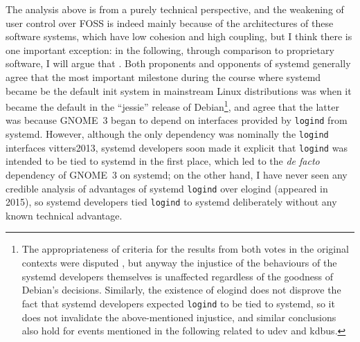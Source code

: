 The analysis above is from a purely technical perspective, and the weakening
of user control over FOSS is indeed mainly because of the architectures of these
software systems, which have low cohesion and high coupling, but I think there
is one important exception: in the following, through comparison to proprietary
software, I will argue that .  Both proponents and
opponents of systemd generally agree that the most important milestone during
the course where systemd became be the default init system in mainstream
Linux distributions was when it became the default in the ``jessie'' release
of Debian\footnote{The appropriateness of
criteria for the results from both votes in the original contexts were disputed%
, but anyway the injustice of the behaviours
of the systemd developers themselves is unaffected regardless of the goodness
of Debian's decisions.  Similarly, the existence of elogind does not disprove
the fact that systemd developers expected \texttt{logind} to be tied to systemd,
so it does not invalidate the above-mentioned injustice, and similar conclusions
also hold for events mentioned in the following related to udev and kdbus.},
and agree that the latter was because GNOME~3 began to depend on interfaces
provided by \verb|logind| from systemd.  However, although
the only dependency was nominally the \verb|logind| interfaces\cupercite%
{vitters2013}, systemd developers soon made it explicit that \verb|logind| was
intended to be tied to systemd in the first place,
which led to the \emph{de facto} dependency of GNOME~3 on systemd; on the
other hand, I have never seen any credible analysis of advantages of systemd
\verb|logind| over elogind (appeared in 2015), so systemd developers tied
\verb|logind| to systemd deliberately without any known technical advantage.

